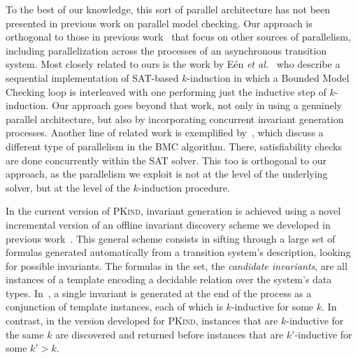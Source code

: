 \documentclass[submission,copyright,creativecommons]{eptcs}
\newcommand{\define}[1]{\emph{#1}}
\newcommand{\PKind}{\textrm{\textsc{PKind}}\xspace}
\begin{document}
To the best of our knowledge, this sort of parallel architecture has
not been presented in previous work on parallel model checking. Our
approach is orthogonal to those in previous work~\cite{BBCR10b} that
focus on other sources of parallelism, including parallelization
across the processes of an asynchronous transition system. Most
closely related to ours is the work by E{\'e}n \textit{et
  al.}~\cite{ES2003} who describe a sequential implementation of
SAT-based $k$-induction in which a Bounded Model Checking 
loop is interleaved with one
performing just the inductive step of $k$-induction.
Our approach goes beyond that work, not only in using a genuinely
parallel architecture, but also by incorporating concurrent invariant
generation processes. Another line of
related
work is exemplified
by~\cite{Erika07,tarmo09,Bradley11}, which discuss a different type of
parallelism in the BMC algorithm. There, satisfiability checks are
done concurrently within the SAT solver. This too is
orthogonal
to our approach, as the parallelism we exploit is not at the level of
the underlying solver, but at the level of the $k$-induction procedure.

In the current version of \PKind, invariant generation is achieved
using a novel incremental version of an offline invariant discovery
scheme we developed in previous work~\cite{Kahsai-Ge-Tinelli-10}. This
general scheme consists in sifting through a large set of formulas
generated automatically from a transition system's description,
looking for possible invariants.  The formulas in the set, the
\define{candidate invariants}, are all instances of a template encoding a
decidable relation over the system's data
types. In~\cite{Kahsai-Ge-Tinelli-10}, a single invariant is generated
at the end of the process as a conjunction of template instances, each
of which is $k$-inductive for some $k$.  In contrast, in the version
developed for \PKind, instances that are $k$-inductive for the same
$k$ are discovered and returned before instances that are
$k'$-inductive for some $k' > k$.
\end{document}
